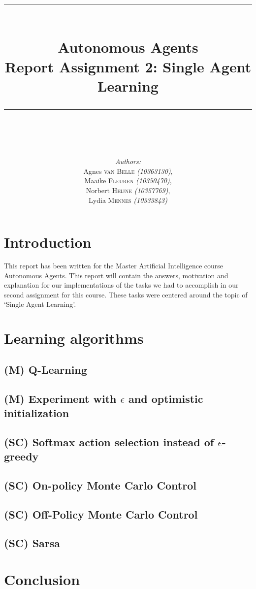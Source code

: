 \documentclass{article}
\newcommand{\HRule}{\rule{\linewidth}{0.1mm}}
\begin{document}
\title{ \HRule \\[0.2cm]
		Autonomous Agents\\ 
		Report Assignment 2: Single Agent Learning\\
		\HRule \\[0.1cm]
		}
		
\author{
		\emph{Authors:}\\[0.2cm]
		Agnes \textsc{van Belle} \small{ \emph{(10363130)}},\\ 
		Maaike \textsc{Fleuren} \small{ \emph{(10350470)}}, \\
		Norbert \textsc{Heijne} \small{ \emph{(10357769)}}, \\
		Lydia \textsc{Mennes} \small{ \emph{(10333843)}}
		}
		
\maketitle

\section{Introduction}
This report has been written for the Master Artificial Intelligence course Autonomous Agents. This report will contain the answers, motivation and explanation for our implementations of the tasks we had to accomplish in our second assignment for this course. These tasks were centered around the topic of `Single Agent Learning'. 

\section{Learning algorithms}
\subsection{(M) Q-Learning}
\subsection{(M) Experiment with $\epsilon$ and optimistic initialization}
\subsection{(SC) Softmax action selection instead of $\epsilon$-greedy}
\subsection{(SC) On-policy Monte Carlo Control}
\subsection{(SC) Off-Policy Monte Carlo Control}
\subsection{(SC) Sarsa}

\section{Conclusion}
\end{document}
